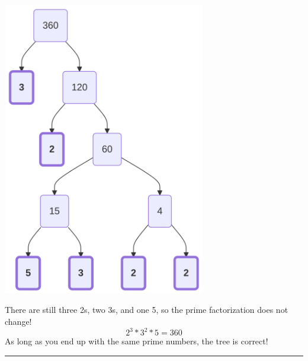 \documentclass[
  letterpaper,
  DIV=11,
  numbers=noendperiod]{scrreprt}
\begin{document}
\label{mermaid-diagram}
\includegraphics[width=3.47in,height=5.06in]{chapters/Unit_1/1.2_Factors_Multiples_&_Prime_Factorization_files/figure-latex/mermaid-figure-6.png}

There are still three 2s, two 3s, and one 5, so the prime factorization
does not change! \[2^3 * 3^2 * 5 = 360\] As long as you end up with the
same prime numbers, the tree is correct!

\begin{center}\rule{0.5\linewidth}{0.5pt}\end{center}
\end{document}
